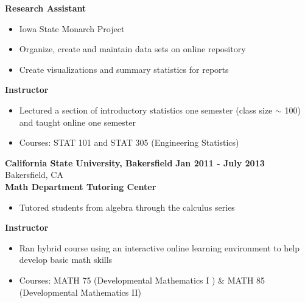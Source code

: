 \documentclass{article}
\newenvironment{innerlist}[1][\enskip\textbullet]%
        {\begin{itemize}[#1,leftmargin=*,parsep=0pt,itemsep=0pt,topsep=0pt,partopsep=0pt]}
        {\end{itemize}}
\begin{document}
\textbf{Research Assistant}
\begin{innerlist}
  \item Iowa State Monarch Project
  \item Organize, create and maintain data sets on online repository
  \item Create visualizations and summary statistics for reports
\end{innerlist}

\textbf{Instructor}
\begin{innerlist}
  \item Lectured a section of introductory statistics one semester (class size $\sim$ 100) and taught online one semester
  \item Courses: STAT 101 and STAT 305 (Engineering Statistics) \\
\end{innerlist}


\textbf{California State University, Bakersfield} \hfill {\textbf{Jan 2011 - July 2013}}\\
Bakersfield, CA \\
\textbf{Math Department Tutoring Center}
\begin{innerlist}
  \item Tutored students from algebra through the calculus series
\end{innerlist}

\textbf{Instructor}
\begin{innerlist}
  \item Ran hybrid course using an interactive online learning environment to help develop basic math skills
  \item Courses: MATH 75 (Developmental Mathematics I ) \& MATH 85 (Developmental Mathematics II)
\end{innerlist}
\end{document}
